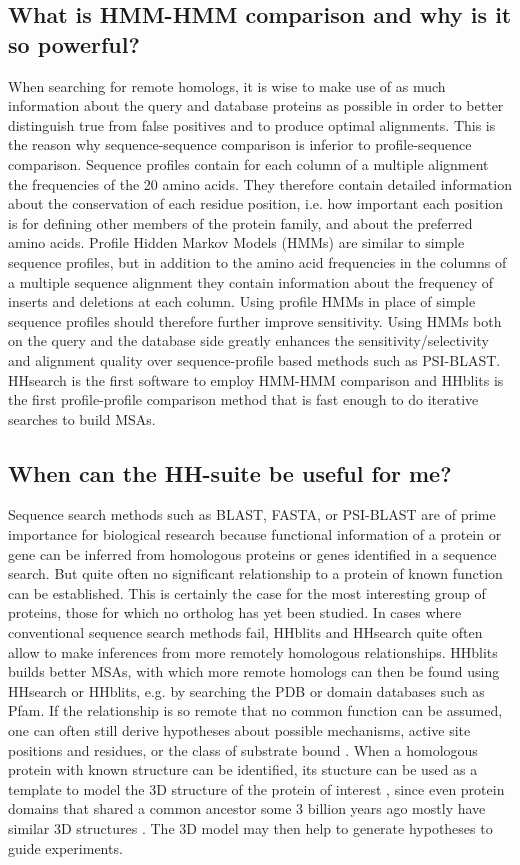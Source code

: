 \documentclass[11pt,a4paper]{article}
\begin{document}
\subsection{What is HMM-HMM comparison and why is it so powerful?}
When searching for remote homologs, it is wise to make use of as much information about the query and database proteins as possible in order to better distinguish true from false positives and to produce optimal alignments. This is the reason why sequence-sequence comparison is inferior to profile-sequence comparison. Sequence profiles contain for each column of a multiple alignment the frequencies of the 20 amino acids. They therefore contain detailed information about the conservation of each residue position, i.e. how important each position is for defining other members of the protein family, and about the preferred amino acids. Profile Hidden Markov Models (HMMs) are similar to simple sequence profiles, but in addition to the amino acid frequencies in the columns of a multiple sequence alignment they contain information about the frequency of inserts and deletions at each column. Using profile HMMs in place of simple sequence profiles should therefore further improve sensitivity. Using HMMs both on the query and the database side greatly enhances the sensitivity/selectivity and alignment quality over sequence-profile based methods such as PSI-BLAST. HHsearch is the first software to employ HMM-HMM comparison and HHblits is the first profile-profile comparison method that is fast enough to do iterative searches to build MSAs. 

\subsection{When can the HH-suite be useful for me?}
Sequence search methods such as BLAST, FASTA, or PSI-BLAST are of prime importance for biological research because functional information of a protein or gene can be inferred from homologous proteins or genes identified in a sequence search. But quite often no significant relationship to a protein of known function can be established. This is certainly the case for the most interesting group of proteins, those for which no ortholog has yet been studied. In cases where conventional sequence search methods fail, HHblits and HHsearch quite often allow to make inferences from more remotely homologous relationships. HHblits builds better MSAs, with which more remote homologs can then be found using HHsearch or HHblits, e.g. by searching the PDB or domain databases such as Pfam. If the relationship is so remote that no common function can be assumed, one can often still derive hypotheses about possible mechanisms, active site positions and residues, or the class of substrate bound \cite{Todd:2001, Pawlowski:2000}. When a homologous protein with known structure can be identified, its stucture can be used as a template to model the 3D structure of the protein of interest \cite{Rychlewski:1998}, since even protein domains that shared a common ancestor some 3 billion years ago mostly have similar 3D structures \cite{Kinch:2002,Soding:2006a,Alva:2010}. The 3D model may then help to generate hypotheses to guide experiments. 
\end{document}
